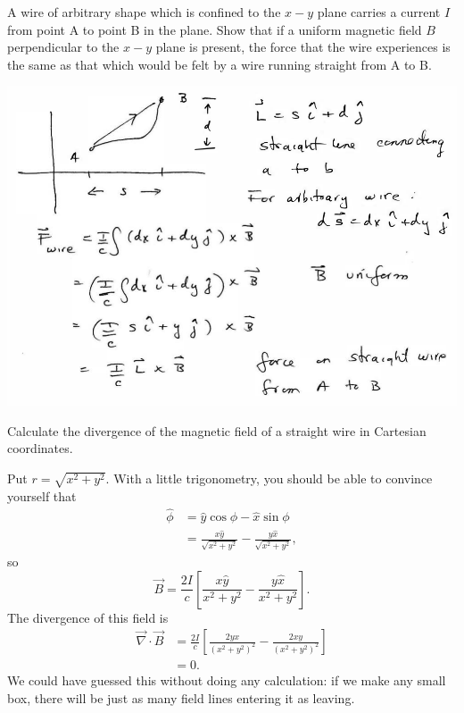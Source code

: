\documentclass[makesolutionspdf]{esg8022pset}
\begin{document}
\begin{problem}{}
  A wire of arbitrary shape which is confined to the $x-y$ plane carries a current $I$ from point A to point B in the plane. Show that if a uniform magnetic field $B$ perpendicular to the $x-y$ plane is present, the force that the wire experiences is the same as that which would be felt by a wire running straight from A to B.
\end{problem}
\begin{solution}
  \begin{center}\includegraphics{ps07_sol_04_1.pdf}\end{center}
\end{solution}





\begin{problem}{}
  Calculate the divergence of the magnetic field of a straight wire in Cartesian coordinates.
\end{problem}
\begin{solution}
  Put $r = \sqrt{x^2 + y^2}$.  With a little trigonometry, you should be able to convince yourself that 
  \begin{align*}
    \hat\phi & = \hat y \cos\phi - \hat x\sin\phi \\
      & = \frac{x\hat y}{\sqrt{x^2 + y^2}} - \frac{y\hat x}{\sqrt{x^2 + y^2}},
  \end{align*}
  so
  $$\vec B = \frac{2I}{c}\left[\frac{x\hat y}{x^2 + y^2} - \frac{y\hat x}{x^2 + y^2}\right].$$
  The divergence of this field is
  \begin{align*}
    \vec\nabla \cdot \vec B & = \frac{2I}{c}\left[\frac{2yx}{(x^2 + y^2)^2} - \frac{2xy}{(x^2 + y^2)^2}\right] \\
      & = 0.
  \end{align*}
  We could have guessed this without doing any calculation: if we make any small box, there will be just as many field lines entering it as leaving.
\end{solution}
\end{document}
